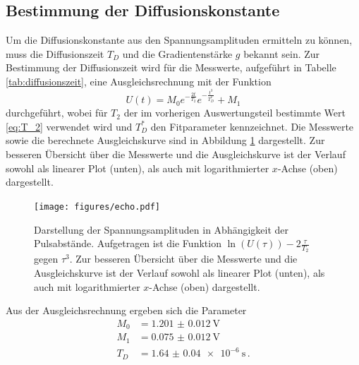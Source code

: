 \subsection*{Bestimmung der Diffusionskonstante}
Um die Diffusionskonstante aus den Spannungsamplituden
ermitteln zu können, muss die Diffusionszeit $T_D$ und die Gradientenstärke $g$ bekannt sein.
Zur Bestimmung der Diffusionszeit wird für die Messwerte, aufgeführt in Tabelle \ref{tab:diffusionszeit},
eine Ausgleichsrechnung mit der Funktion
\begin{equation*}
    U(t) = M_0 e^{-\frac{2t}{T_2}} e^{-\frac{t^3}{T_D^*}} + M_1
\end{equation*}
durchgeführt, wobei für $T_2$ der im vorherigen Auswertungsteil bestimmte Wert \ref{eq:T_2}
verwendet wird und $T_D^*$ den Fitparameter kennzeichnet.
Die Messwerte sowie die berechnete Ausgleichskurve sind in Abbildung \ref{fig:echo} dargestellt.
Zur besseren Übersicht über die Messwerte und die Ausgleichskurve ist der Verlauf sowohl als 
linearer Plot (unten), als auch mit logarithmierter $x$-Achse (oben) dargestellt.
\begin{figure}
    \centering
    \texttt{[image: figures/echo.pdf]}
    \caption{Darstellung der Spannungsamplituden in Abhängigkeit der Pulsabstände. Aufgetragen ist die 
    Funktion $\ln (U(\tau)) - 2 \frac{\tau}{T_2}$ gegen $\tau^3$.
    Zur besseren Übersicht über die Messwerte und die Ausgleichskurve ist der Verlauf sowohl als 
    linearer Plot (unten), als auch mit logarithmierter $x$-Achse (oben) dargestellt.}
    \label{fig:echo}
\end{figure}
Aus der Ausgleichsrechnung ergeben sich die Parameter
\begin{align*}
    M_0 &= \SI{1.201(12)}{\volt} \\
    M_1 &= \SI{0.075(12)}{\volt} \\
    T_D &= \SI{1.64(4)e-6}{\second} \, .
\end{align*}

